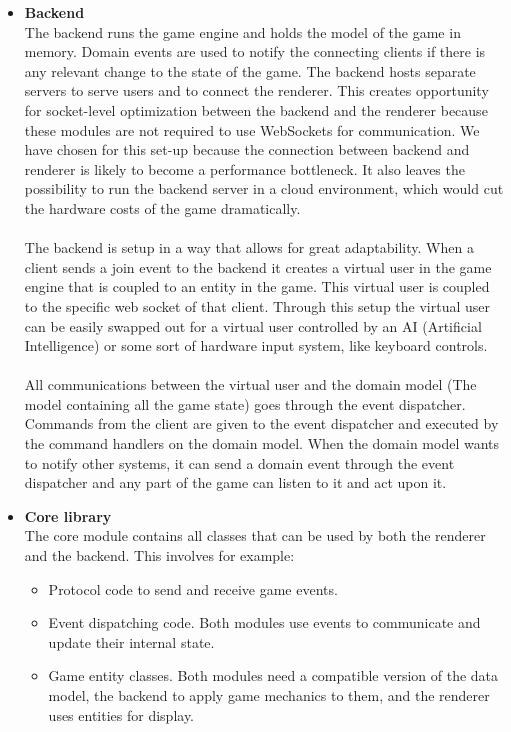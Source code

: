 \documentclass[11pt,a4paper]{article}
\begin{document}
\begin{itemize}
\item \textbf{Backend} \\
The backend runs the game engine and holds the model of the game in memory. Domain events are used to notify the connecting clients if there is any relevant change to the state of the game. The backend hosts separate servers to serve users and to connect the renderer. This creates opportunity for socket-level optimization between the backend and the renderer because these modules are not required to use WebSockets for communication. We have chosen for this set-up because the connection between backend and renderer is likely to become a performance bottleneck. It also leaves the possibility to run the backend server in a cloud environment, which would cut the hardware costs of the game dramatically.\\
\\
The backend is setup in a way that allows for great adaptability. When a client sends a join event to the backend it creates a virtual user in the game engine that is coupled to an entity in the game. This virtual user is coupled to the specific web socket of that client. Through this setup the virtual user can be easily swapped out for a virtual user controlled by an AI (Artificial Intelligence) or some sort of hardware input system, like keyboard controls.\\
\\
All communications between the virtual user and the domain model (The model containing all the game state) goes through the event dispatcher. Commands from the client are given to the event dispatcher and executed by the command handlers on the domain model. When the domain model wants to notify other systems, it can send a domain event through the event dispatcher and any part of the game can listen to it and act upon it.

\item \textbf{Core library} \\
The core module contains all classes that can be used by both the renderer and the backend. This involves for example:
\begin{itemize}
\item Protocol code to send and receive game events.
\item Event dispatching code. Both modules use events to communicate and update their internal state.
\item Game entity classes. Both modules need a compatible version of the data model, the backend to apply game mechanics to them, and the renderer uses entities for display.
\end{itemize}

\end{itemize}
\end{document}
